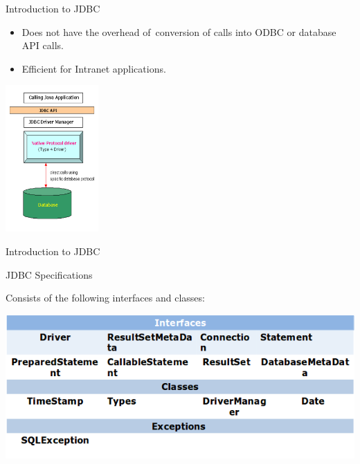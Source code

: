 \documentclass[14pt]{beamer}
\begin{document}
\begin{frame}{Introduction to JDBC}
\begin{itemize}
\item Does not have the overhead of conversion of calls into ODBC or database API calls.
\item Efficient for Intranet applications.
\end{itemize}
\begin{center}
    \includegraphics[scale=0.5]{JEE-M03-S01-Image5.png}
  \end{center}
\end{frame}


\begin{frame}{Introduction to JDBC}
\begin{block}{}
JDBC Specifications
\end{block}
Consists of the following interfaces and classes:
\begin{center}
    \includegraphics[scale=0.5]{JEE-M03-S01-Image6.png}
  \end{center}
\end{frame}
\end{document}
